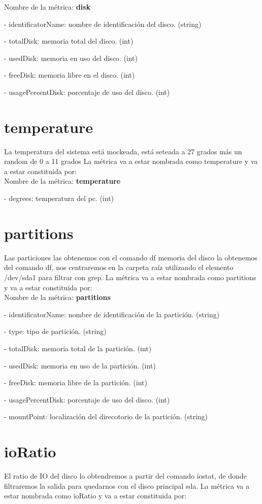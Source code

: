 \documentclass[ spanish, a4paper, 12pt, twoside]{report}
\begin{document}
Nombre de la métrica: \textbf{disk}

\hyp{} identificatorName: nombre de identificación del disco. (string)
 
\hyp{} totalDisk: memoria total del disco. (int)
 
\hyp{} usedDisk: memoria en uso del disco. (int)
 
\hyp{} freeDisk: memoria libre en el disco. (int)
 
\hyp{} usagePercentDisk: porcentaje de uso del disco. (int)

\section{temperature}
La temperatura del sistema está mockeada, está seteada a 27 grados más un random de 0 a 11 grados 
La métrica va a estar nombrada como temperature y va a estar constituida por:\\
  
Nombre de la métrica: \textbf{temperature}
 
\hyp{} degrees: temperatura del pc. (int)

\section{partitions}
Las particiones las obtenemos con el comando df memoria del disco la obtenemos del comando df, nos centraremos en la carpeta raíz utilizando 
el elemento /dev/sda1 para filtrar con grep. La métrica va a estar nombrada como partitions y va a estar constituida por:\\
   
Nombre de la métrica: \textbf{partitions}
  
\hyp{} identificatorName: nombre de identificación de la partición. (string)

\hyp{} type: tipo de partición. (string)
  
\hyp{} totalDisk: memoria total de la partición. (int)
  
\hyp{} usedDisk: memoria en uso de la partición. (int)
  
\hyp{} freeDisk: memoria libre de la partición. (int)
  
\hyp{} usagePercentDisk: porcentaje de uso del disco. (int)
   
\hyp{} mountPoint: localización del direcotorio de la partición. (string)

\section{ioRatio}
El ratio de IO del disco lo obtendremos a partir del comando iostat, de donde filtraremos la salida para quedarnos con el disco principal sda.
La métrica va a estar nombrada como ioRatio y va a estar constituida por:\\
 
\end{document}
